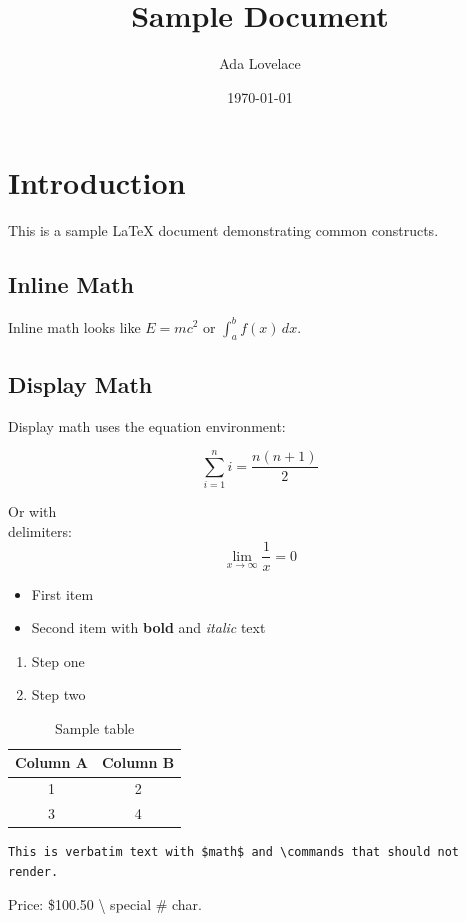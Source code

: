 \documentclass[12pt,a4paper]{article}
\title{Sample Document}
\author{Ada Lovelace}
\date{\today}
\begin{document}
\maketitle

\section{Introduction}
This is a sample \LaTeX{} document demonstrating common constructs.

\subsection{Inline Math}
Inline math looks like $E = mc^2$ or $\int_{a}^{b} f(x) \, dx$.

\subsection{Display Math}
Display math uses the equation environment:

\begin{equation}
    \sum_{i=1}^{n} i = \frac{n(n+1)}{2}
\end{equation}

Or with \[ \] delimiters:
\[
    \lim_{x \to \infty} \frac{1}{x} = 0
\]

\begin{itemize}
    \item First item
    \item Second item with \textbf{bold} and \textit{italic} text
\end{itemize}

\begin{enumerate}
    \item Step one
    \item Step two
\end{enumerate}

\begin{table}[h]
    \centering
    \begin{tabular}{|c|c|}
        \hline
        Column A & Column B \\
        \hline
        1 & 2 \\
        3 & 4 \\
        \hline
    \end{tabular}
    \caption{Sample table}
\end{table}

\begin{verbatim}
This is verbatim text with $math$ and \commands that should not render.
\end{verbatim}

Price: \$100.50 \textbackslash{} special \# char.
\end{document}
